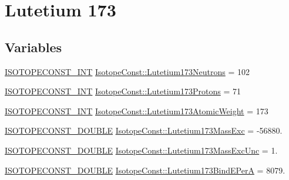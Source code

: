 \hypertarget{group___isotope_const-_lutetium-_lu173}{}\section{Lutetium 173}
\label{group___isotope_const-_lutetium-_lu173}
\subsection*{Variables}
\begin{DoxyCompactItemize}
\item 
\mbox{\hyperlink{group___isotope_const-_macros_ga5f18360b3e99483a35c32d789e62621c}{I\+S\+O\+T\+O\+P\+E\+C\+O\+N\+S\+T\+\_\+\+I\+NT}} \mbox{\hyperlink{group___isotope_const-_lutetium-_lu173_gac9e7f09ba8bc3f11db549970591cc0fe}{Isotope\+Const\+::\+Lutetium173\+Neutrons}} = 102
\item 
\mbox{\hyperlink{group___isotope_const-_macros_ga5f18360b3e99483a35c32d789e62621c}{I\+S\+O\+T\+O\+P\+E\+C\+O\+N\+S\+T\+\_\+\+I\+NT}} \mbox{\hyperlink{group___isotope_const-_lutetium-_lu173_gadf9de89198b5cea865c8f362b78ab02b}{Isotope\+Const\+::\+Lutetium173\+Protons}} = 71
\item 
\mbox{\hyperlink{group___isotope_const-_macros_ga5f18360b3e99483a35c32d789e62621c}{I\+S\+O\+T\+O\+P\+E\+C\+O\+N\+S\+T\+\_\+\+I\+NT}} \mbox{\hyperlink{group___isotope_const-_lutetium-_lu173_ga1d19dcc9a54906c7a91f4c18323aba69}{Isotope\+Const\+::\+Lutetium173\+Atomic\+Weight}} = 173
\item 
\mbox{\hyperlink{group___isotope_const-_macros_ga8f45a7272ce02c0b4c65c44636ed719a}{I\+S\+O\+T\+O\+P\+E\+C\+O\+N\+S\+T\+\_\+\+D\+O\+U\+B\+LE}} \mbox{\hyperlink{group___isotope_const-_lutetium-_lu173_gabefba8f9fea2bd24eef29281dcc4f037}{Isotope\+Const\+::\+Lutetium173\+Mass\+Exc}} = -\/56880.
\item 
\mbox{\hyperlink{group___isotope_const-_macros_ga8f45a7272ce02c0b4c65c44636ed719a}{I\+S\+O\+T\+O\+P\+E\+C\+O\+N\+S\+T\+\_\+\+D\+O\+U\+B\+LE}} \mbox{\hyperlink{group___isotope_const-_lutetium-_lu173_ga9b2df69228ace8dc5b831dd0d04b44ef}{Isotope\+Const\+::\+Lutetium173\+Mass\+Exc\+Unc}} = 1.
\item 
\mbox{\hyperlink{group___isotope_const-_macros_ga8f45a7272ce02c0b4c65c44636ed719a}{I\+S\+O\+T\+O\+P\+E\+C\+O\+N\+S\+T\+\_\+\+D\+O\+U\+B\+LE}} \mbox{\hyperlink{group___isotope_const-_lutetium-_lu173_gae54389839b655417e206d38ac4ddb7a1}{Isotope\+Const\+::\+Lutetium173\+Bind\+E\+PerA}} = 8079.
\item 

\end{DoxyCompactItemize}
